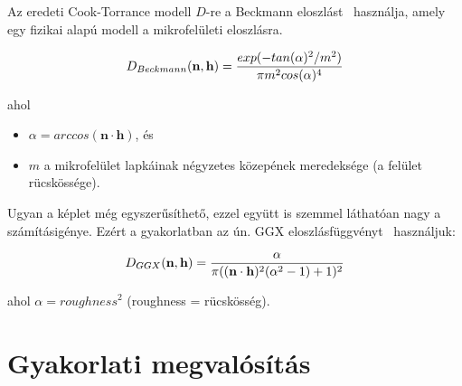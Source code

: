 Az eredeti Cook-Torrance modell \(D\)-re a Beckmann eloszlást~\cite{beckmann1987scattering} használja, amely egy fizikai alapú modell a mikrofelületi eloszlásra.

\[
D_{Beckmann}(\mathbf{n}, \mathbf{h}) = { { exp(-tan(\alpha)^2 / m^2) } \over { \pi m^2 cos(\alpha)^4 } }
\]

ahol

\begin{itemize}[noitemsep]
\item \(\alpha = arccos(\mathbf{n} \cdot \mathbf{h})\), és
\item \(m\) a mikrofelület lapkáinak négyzetes közepének meredeksége (a felület rücskössége).
\end{itemize}

Ugyan a képlet még egyszerűsíthető, ezzel együtt is szemmel láthatóan nagy a számításigénye. Ezért a gyakorlatban az ún. GGX eloszlásfüggvényt~\cite{walter2007microfacet} használjuk:

\[
D_{GGX}(\mathbf{n}, \mathbf{h}) = { \alpha \over { \pi ((\mathbf{n} \cdot \mathbf{h})^2 (\alpha^2 - 1) + 1)^2 } }
\]

ahol \(\alpha = {roughness}^2\) (roughness = rücskösség).

\section{Gyakorlati megvalósítás}


